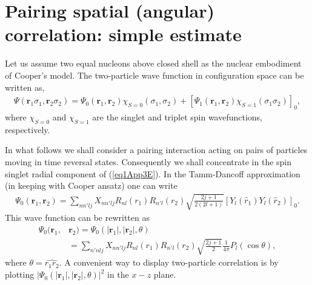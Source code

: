 \section[Simple estimate]{Pairing spatial (angular) correlation: simple estimate}\label{app3D}
Let us assume two equal nucleons above closed shell as the nuclear embodiment of Cooper's model. The two-particle wave function in configuration space can be written as,
\begin{align}\label{eq1App3E}
\Psi(\mathbf r_1\sigma_1,\mathbf r_2\sigma_2)=\Psi_0(\mathbf r_1,\mathbf r_2)\chi_{S=0}(\sigma_1,\sigma_2)+\left[\Psi_1(\mathbf r_1,\mathbf r_2)\chi_{S=1}(\sigma_1\sigma_2)\right]_0,
\end{align}
where $\chi_{S=0}$ and $\chi_{S=1}$ are the singlet and triplet spin wavefunctions, respectively.

In what follows we shall consider a pairing interaction acting on pairs of particles moving in time reversal states. Consequently we shall concentrate in the spin singlet radial component of (\ref{eq1App3E}). In the Tamm-Dancoff approximation (in keeping with Cooper ansatz) one can write
\begin{align}\label{eq2App3E}
\Psi_0(\mathbf r_1,\mathbf r_2)=\sum_{nn'lj}X_{nn'lj}R_{nl}(r_1)R_{n'l}(r_2)\sqrt{\frac{2j+1}{2(2l+1)}}\left[Y_l(\hat r_1)Y_l(\hat r_2)\right]_0.
\end{align}
This wave function can be rewritten as
\begin{align}\label{eq3App3Ex}
\nonumber\Psi_0(\mathbf r_1,&\mathbf r_2)=\Psi_0(|\mathbf r_1|,|\mathbf r_2|,\theta)\\
&=\sum_{n'nlj}X_{nn'lj}R_{nl}(r_1)R_{n'l}(r_2)\sqrt{\frac{2j+1}{2}}\frac{1}{4\pi}P_l(\cos\theta),
\end{align}
where $\theta=\widehat{r_1r_2}$. A convenient way to display two-particle correlation is by plotting $|\Psi_0(|\mathbf r_1|,|\mathbf r_2|,\theta)|^2$ in the $x-z$ plane.





